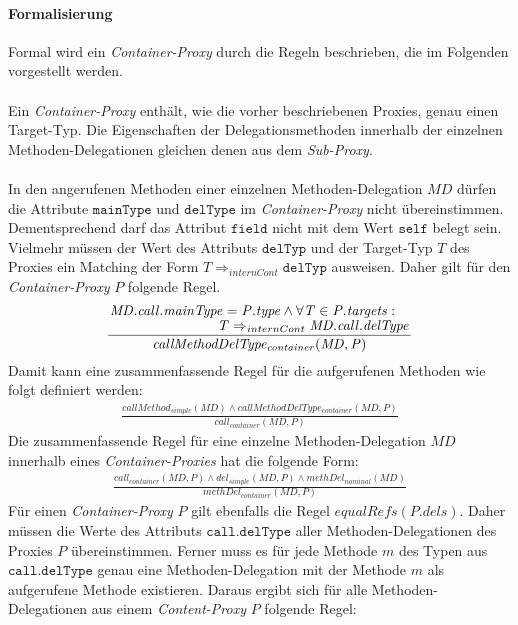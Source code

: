\documentclass[a4paper,12pt]{article}
\begin{document}
\paragraph{Formalisierung}
Formal wird ein \emph{Container-Proxy} durch die Regeln beschrieben, die im Folgenden vorgestellt werden.\\\\
Ein \emph{Container-Proxy} enthält, wie die vorher beschriebenen Proxies, genau einen Target-Typ. Die Eigenschaften der Delegationsmethoden innerhalb der einzelnen Methoden-Delegationen gleichen denen aus dem \emph{Sub-Proxy}.\\\\
In den angerufenen Methoden einer einzelnen Methoden-Delegation $\mathit{MD}$ dürfen die Attribute $\texttt{mainType}$ und $\texttt{delType}$ im \emph{Container-Proxy} nicht übereinstimmen. Dementsprechend darf das Attribut $\texttt{field}$ nicht mit dem Wert $\texttt{self}$ belegt sein. Vielmehr müssen der Wert des Attributs $\texttt{delTyp}$ und der Target-Typ $T$ des Proxies ein Matching der Form $T \Rightarrow_{internCont} \texttt{delTyp}$ ausweisen. Daher gilt für den \emph{Container-Proxy} $P$ folgende Regel.
\begin{gather*}
\frac{\splitfrac{\mathit{MD.call.mainType} = \mathit{P.type} \wedge \forall \mathit{T} \in \mathit{P.targets}:}
{  \mathit{T} \Rightarrow_{internCont} \mathit{MD.call.delType}}
}
{\mathit{callMethodDelType_{container}(MD,P)}}
\end{gather*}
\noindent
Damit kann eine zusammenfassende Regel für die aufgerufenen Methoden wie folgt definiert werden:
\begin{gather*}
\frac{\mathit{callMethod_{simple}(MD)} \wedge \mathit{callMethodDelType_{container}(MD,P)}}
{\mathit{call_{container}(MD,P)}}
\end{gather*}
Die zusammenfassende Regel für eine einzelne Methoden-Delegation $\mathit{MD}$ innerhalb eines \emph{Container-Proxies} hat die folgende Form:
\begin{gather*}
\frac{\mathit{call_{container}(MD,P)} \wedge \mathit{del_{simple}(MD,P)} \wedge \mathit{methDel_{nominal}(MD)}}
{\mathit{methDel_{container}(MD,P)}}
\end{gather*}
Für einen \emph{Container-Proxy} $P$ gilt ebenfalls die Regel $\mathit{equalRefs(P.dels)}$. Daher müssen die Werte des Attributs $\texttt{call.delType}$ aller Methoden-Delegationen des Proxies $P$ übereinstimmen. Ferner muss es für jede Methode $m$ des Typen aus $\texttt{call.delType}$ genau eine Methoden-Delegation mit der Methode $m$ als aufgerufene Methode existieren. Daraus ergibt sich für alle Methoden-Delegationen aus einem \emph{Content-Proxy} $P$ folgende Regel:
\end{document}
